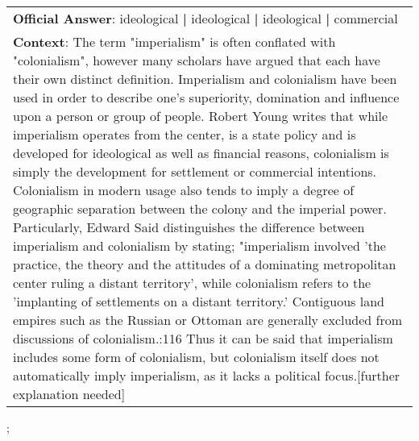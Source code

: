 \begin{figure*}[ht]
{\begin{tabular}{p{}}
            \textbf{Official Answer}: ideological \textbf{|} ideological \textbf{|} ideological \textbf{|} commercial                                                                                                                                                                                                                                                                                                                                                                                                                                                                                                                                                                                                                                                                                                                                                                                                                                                                                                                                                                                                                                                                                                                                                                                                                            \\
            \textbf{Context}: The term "imperialism" is often conflated with "colonialism", however many scholars have argued that each have their own distinct definition. Imperialism and colonialism have been used in order to describe one's superiority, domination and influence upon a person or group of people. Robert Young writes that while imperialism operates from the center, is a state policy and is developed for ideological as well as financial reasons, colonialism is simply the development for settlement or commercial intentions. Colonialism in modern usage also tends to imply a degree of geographic separation between the colony and the imperial power. Particularly, Edward Said distinguishes the difference between imperialism and colonialism by stating; "imperialism involved 'the practice, the theory and the attitudes of a dominating metropolitan center ruling a distant territory', while colonialism refers to the 'implanting of settlements on a distant territory.' Contiguous land empires such as the Russian or Ottoman are generally excluded from discussions of colonialism.:116 Thus it can be said that imperialism includes some form of colonialism, but colonialism itself does not automatically imply imperialism, as it lacks a political focus.[further explanation needed] \\
        \end{tabular}
    };
    \label{fig:ex-573083dc2461fd1900a9ce6f}
\end{figure*}

